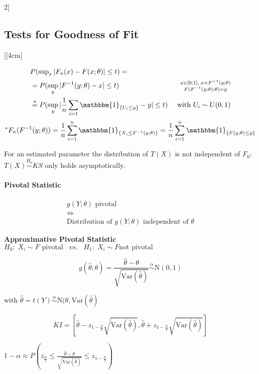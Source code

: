 \documentclass[8pt]{extarticle}
\begin{document}
\begin{multicols}{2}[\subsection{Tests for Goodness of Fit}][4cm]
\begin{Proof}
\vspace{-1em}
\begin{align*}
\intertext{$P(\sup_x |F_n(x) - F(x;\theta)|\leq t) = $}
&= P(\sup_y |F^{-1}(y;\theta) - x|\leq t) & \substack{x\in\left[0,1\right],\: x {=} F^{-1}(y;\theta)\\ F(F^{-1}(y;\theta);\theta){=}y}\\
&\overset{*}{=} P(\sup_y |\frac{1}{n}\sum_{i=1} \mathbbm{1}_{\{U_i\leq y\}} - y|\leq t) & \text{ with } U_i \sim U(0,1)
\end{align*}
$$^*F_n(F^{{-}1}(y;\theta)) = \frac{1}{n}\sum_{i=1}^n\mathbbm{1}_{\{X_i\leq F^{{-}1}(y;\theta)\}}  = \frac{1}{n}\sum_{i=1}^n\mathbbm{1}_{\{F(y;\theta) \leq y\}}$$
\end{Proof}

\noindent For an estimated parameter the distribution of $T(X)$ is not independent of $F_0$: $T(X) \overset{H_0}{\sim} KS$ only holds asymptotically.

\paragraph{Pivotal Statistic}

$$\begin{gathered}
g(Y;\theta) \text{ pivotal}\\
\Leftrightarrow \\
\text{Distribution of } g(Y;\theta) \text{ independent of } \theta
\end{gathered}$$

\textbf{Approximative Pivotal Statistic}
\indent $H_0\!:\; X_i \sim F \text{ pivotal} \;\;\; vs. \;\;\; H_1\!:\; X_i \sim F \text{not pivotal }$

$$g(\hat{\theta};\theta) = \frac{\hat{\theta} - \theta}{\sqrt{\textrm{Var}(\hat{\theta})}} \overset{\alpha}{\sim} \mathrm{N}(0,1)$$

with $\hat{\theta} = t(Y) \overset{\alpha}{\sim} \mathrm{N}(\theta,\mathrm{Var}(\hat{\theta})$

$$KI = \left[ \hat{\theta} - z_{1-\frac{\alpha}{2}}\sqrt{\mathrm{Var}(\hat{\theta})}, \hat{\theta} + z_{1-\frac{\alpha}{2}}\sqrt{\mathrm{Var}(\hat{\theta})} \right]$$

\begin{Proof}
$1-\alpha \approx P \left( z_{\frac{\alpha}{2}} \leq \frac{\hat{\theta} - \theta}{\sqrt{\textrm{Var}(\hat{\theta})}} \leq z_{1-\frac{\alpha}{2}}\right)$
\end{Proof}


\end{multicols}
\end{document}
